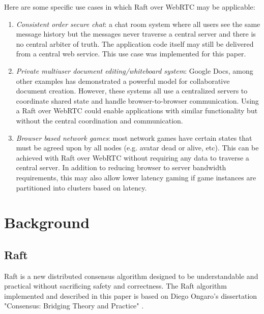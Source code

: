 \documentclass[9pt]{extarticle}
\begin{document}
\begin{multicols}{2}
Here are some specific use cases in which Raft over WebRTC may be
applicable:

\begin{enumerate}
\item \emph{Consistent order secure chat}: a chat room system where
    all users see the same message history but the messages never
    traverse a central server and there is no central arbiter
    of truth. The application code itself may still be delivered from
    a central web service. This use case was implemented
    for this paper.
\item \emph{Private multiuser document editing/whiteboard system}:
    Google Docs, among other examples has demonstrated a powerful
    model for collaborative document creation. However, these systems
    all use a centralized servers to coordinate shared state and
    handle browser-to-browser communication. %
    Using a Raft over WebRTC could enable applications with similar
    functionality but without the central coordination and
    communication.
\item \emph{Browser based network games}: most network games have
    certain states that must be agreed upon by all nodes (e.g. avatar
    dead or alive, etc). This can be achieved with Raft over WebRTC
    without requiring any data to traverse a central server. In
    addition to reducing browser to server bandwidth requirements,
    this may also allow lower latency gaming if game instances are
    partitioned into clusters based on latency.
\end{enumerate}

\section{Background}

\subsection{Raft}

Raft is a new distributed consensus algorithm designed to be
understandable and practical without sacrificing safety and
correctness. The Raft algorithm implemented and described in this
paper is based on Diego Ongaro's dissertation "Consensus: Bridging
Theory and Practice" \cite{raft_thesis:ongaro14}.


\end{multicols}
\end{document}
